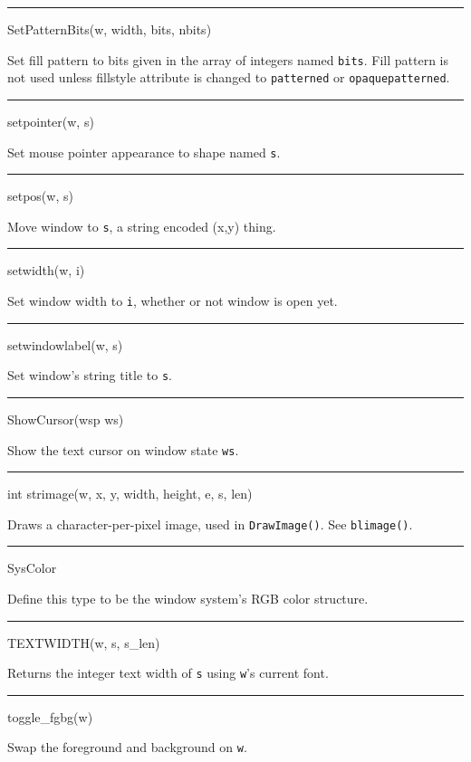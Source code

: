 \bigskip\hrule\vspace{0.1cm}
\noindent
SetPatternBits(w, width, bits, nbits)


Set fill pattern to bits given in the array of integers named
\texttt{bits}. Fill pattern is not used unless fillstyle attribute is
changed to \texttt{{\textquotedbl}patterned{\textquotedbl}} or
\texttt{{\textquotedbl}opaquepatterned{\textquotedbl}}.


\bigskip\hrule\vspace{0.1cm}
\noindent
setpointer(w, s)


Set mouse pointer appearance to shape named \texttt{s}.


\bigskip\hrule\vspace{0.1cm}
\noindent
setpos(w, s)


Move window to \texttt{s}, a string encoded
{\textquotedbl}(x,y){\textquotedbl} thing.


\bigskip\hrule\vspace{0.1cm}
\noindent
setwidth(w, i)


Set window width to \texttt{i}, whether or not window is open yet.


\bigskip\hrule\vspace{0.1cm}
\noindent
setwindowlabel(w, s)


Set window's string title to \texttt{s}.


\bigskip\hrule\vspace{0.1cm}
\noindent
ShowCursor(wsp ws)


Show the text cursor on window state \texttt{ws}.


\bigskip\hrule\vspace{0.1cm}
\noindent
int strimage(w, x, y, width, height, e, s, len)


Draws a character-per-pixel image, used in \texttt{DrawImage()}. See
\texttt{blimage()}.


\bigskip\hrule\vspace{0.1cm}
\noindent
SysColor


Define this type to be the window system's RGB color structure.


\bigskip\hrule\vspace{0.1cm}
\noindent
TEXTWIDTH(w, s, s\_len)


Returns the integer text width of \texttt{s} using \texttt{w}{}'s current font.


\bigskip\hrule\vspace{0.1cm}
\noindent
toggle\_fgbg(w)


Swap the foreground and background on \texttt{w}.


